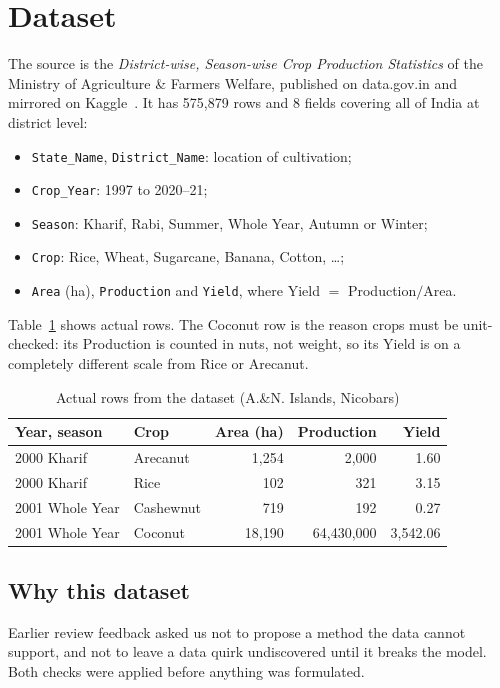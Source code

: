 \documentclass[conference]{IEEEtran}
\begin{document}
\section{Dataset}\label{sec:data}
The source is the \emph{District-wise, Season-wise Crop Production Statistics} of the
Ministry of Agriculture \& Farmers Welfare, published on data.gov.in and mirrored on
Kaggle~\cite{moafw}. It has 575{,}879 rows and 8 fields covering all of India at district
level:
\begin{itemize}
  \item \texttt{State\_Name}, \texttt{District\_Name}: location of cultivation;
  \item \texttt{Crop\_Year}: 1997 to 2020--21;
  \item \texttt{Season}: Kharif, Rabi, Summer, Whole Year, Autumn or Winter;
  \item \texttt{Crop}: Rice, Wheat, Sugarcane, Banana, Cotton, \ldots;
  \item \texttt{Area} (ha), \texttt{Production} and \texttt{Yield}, where Yield $=$ Production$/$Area.
\end{itemize}

Table~\ref{tab:sample} shows actual rows. The Coconut row is the reason crops must be
unit-checked: its Production is counted in nuts, not weight, so its Yield is on a completely
different scale from Rice or Arecanut.

\begin{table}[!t]
\centering
\caption{Actual rows from the dataset (A.\&N. Islands, Nicobars)}\label{tab:sample}
\setlength{\tabcolsep}{3pt}
\begin{tabular}{@{}llrrr@{}}
\toprule
Year, season & Crop & Area (ha) & Production & Yield\\
\midrule
2000 Kharif & Arecanut & 1{,}254 & 2{,}000 & 1.60\\
2000 Kharif & Rice & 102 & 321 & 3.15\\
2001 Whole Year & Cashewnut & 719 & 192 & 0.27\\
2001 Whole Year & Coconut & 18{,}190 & 64{,}430{,}000 & 3{,}542.06\\
\bottomrule
\end{tabular}
\end{table}

\subsection{Why this dataset}
Earlier review feedback asked us not to propose a method the data cannot support, and not to
leave a data quirk undiscovered until it breaks the model. Both checks were applied before
anything was formulated.
\end{document}

